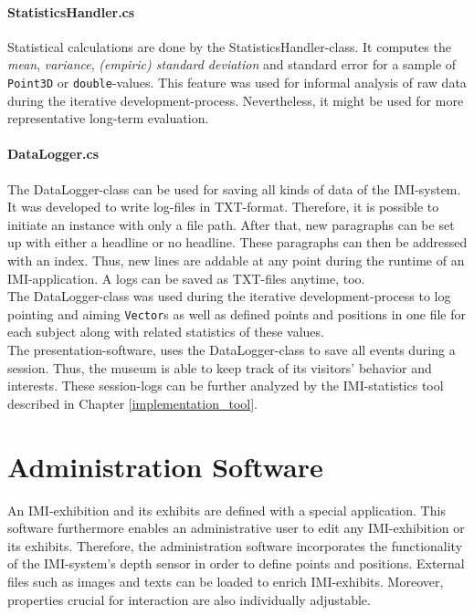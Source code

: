 
\paragraph{StatisticsHandler.cs} Statistical calculations are done by the StatisticsHandler-class. It computes the \textit{mean}, \textit{variance}, \textit{(empiric) standard deviation} and standard error for a sample of \texttt{Point3D} or \texttt{double}-values. This feature was used for informal analysis of raw data during the iterative development-process. Nevertheless, it might be used for more representative long-term evaluation. 


\paragraph{DataLogger.cs} The DataLogger-class can be used for saving all kinds of data of the \ac{IMI}-system. It was developed to write log-files in TXT-format. Therefore, it is possible to initiate an instance with only a file path. After that, new paragraphs can be set up with either a headline or no headline. These paragraphs can then be addressed with an index. Thus, new lines are addable at any point during the runtime of an \ac{IMI}-application. A logs can be saved as TXT-files anytime, too.
\\
The DataLogger-class was used during the iterative development-process to log pointing and aiming \texttt{Vector}s as well as defined points and positions in one file for each subject along with related statistics of these values.
\\
The presentation-software, uses the DataLogger-class to save all events during a session. Thus, the museum is able to keep track of its visitors' behavior and interests. These session-logs can be further analyzed by the \ac{IMI}-statistics tool described in Chapter \ref{implementation_tool}.


\section{Administration Software}
\label{implementation_administration}

An \ac{IMI}-exhibition and its exhibits are defined with a special application. This software furthermore enables an administrative user to edit any \ac{IMI}-exhibition or its exhibits. Therefore, the administration software incorporates the functionality of the \ac{IMI}-system's depth sensor in order to define points and positions. External files such as images and texts can be loaded to enrich \ac{IMI}-exhibits. Moreover, properties crucial for interaction are also individually adjustable.

